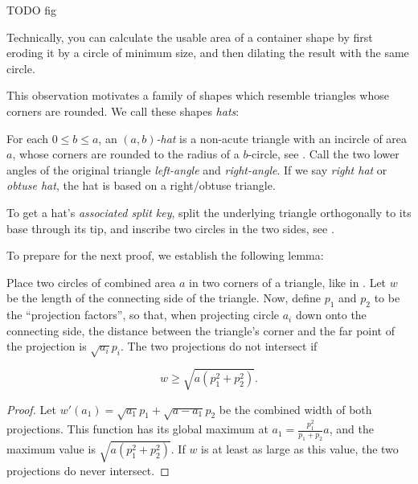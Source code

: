 \documentclass[a4paper,style=print,oneside,bibliography=totoc,nexus,lnum,extramargin]{tubsbook}
\begin{document}
TODO fig

Technically, you can calculate the usable area of a container shape by first eroding it by a circle of minimum size, and then dilating the result with the same circle.

This observation motivates a family of shapes which resemble triangles whose corners are rounded. We call these shapes \emph{hats}:

\begin{definition}
    For each $0 \le b \le a$, an \emph{$(a,b)$-hat} is a non-acute triangle with an incircle of area $a$, whose corners are rounded to the radius of a $b$-circle, see .
    Call the two lower angles of the original triangle \emph{left-angle} and \emph{right-angle}.
    If we say \emph{right hat} or \emph{obtuse hat}, the hat is based on a right/obtuse triangle.
\end{definition}

\newcommand\defaulta{30}
\newcommand\defaultb{40}
\newcommand\defaultr{0.2}
\newcommand\defaultx{0.7}


\begin{definition}\label{def:hat-split-key}
    To get a hat's \emph{associated split key}, split the underlying triangle orthogonally to its base through its tip, and inscribe two circles in the two sides, see .
\end{definition}


To prepare for the next proof, we establish the following lemma:

\begin{lemma}\label{th:overlap}
    Place two circles of combined area $a$ in two corners of a triangle, like in . Let $w$ be the length of the connecting side of the triangle. Now, define $p_1$ and $p_2$ to be the “projection factors”, so that, when projecting circle $a_i$ down onto the connecting side, the distance between the triangle's corner and the far point of the projection is $\sqrt{a_i}p_i$. The two projections do not intersect if

    $$w \ge \sqrt{a(p_1^2 + p_2^2)}.$$
\end{lemma}

\begin{proof}
    Let $w'(a_1) = \sqrt{a_1}p_1 + \sqrt{a-a_1}p_2$ be the combined width of both projections. This function has its global maximum at $a_1 = \frac{p_1^2}{p_1+p_2}a$, and the maximum value is $\sqrt{a(p_1^2+p_2^2)}$. If $w$ is at least as large as this value, the two projections do never intersect.
\end{proof}
\end{document}
